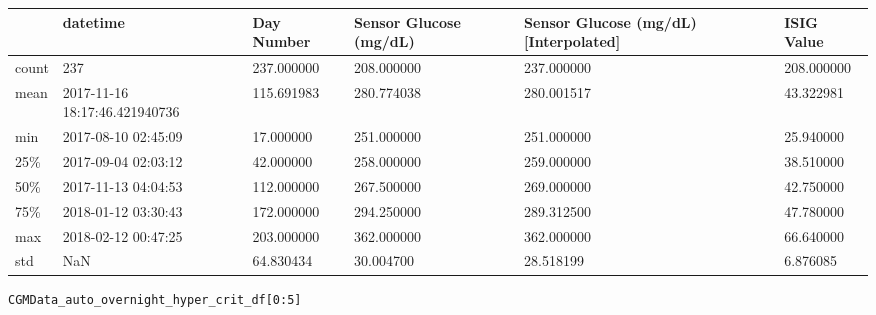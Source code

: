 \bigskip\noindent
\begin{tabular}{p{}p{}p{}p{}p{}p{}}
\toprule
 & datetime & Day Number & Sensor Glucose (mg/dL) & Sensor Glucose (mg/dL) [Interpolated] & ISIG Value \\
\hline
count & 237 & 237.000000 & 208.000000 & 237.000000 & 208.000000 \\
\hline
mean & 2017-11-16 18:17:46.421940736 & 115.691983 & 280.774038 & 280.001517 & 43.322981 \\
\hline
min & 2017-08-10 02:45:09 & 17.000000 & 251.000000 & 251.000000 & 25.940000 \\
\hline
25\% & 2017-09-04 02:03:12 & 42.000000 & 258.000000 & 259.000000 & 38.510000 \\
\hline
50\% & 2017-11-13 04:04:53 & 112.000000 & 267.500000 & 269.000000 & 42.750000 \\
\hline
75\% & 2018-01-12 03:30:43 & 172.000000 & 294.250000 & 289.312500 & 47.780000 \\
\hline
max & 2018-02-12 00:47:25 & 203.000000 & 362.000000 & 362.000000 & 66.640000 \\
\hline
std & NaN & 64.830434 & 30.004700 & 28.518199 & 6.876085 \\
\hline
\bottomrule
\end{tabular}

\bigskip

\begin{verbatim}
CGMData_auto_overnight_hyper_crit_df[0:5]
\end{verbatim}

